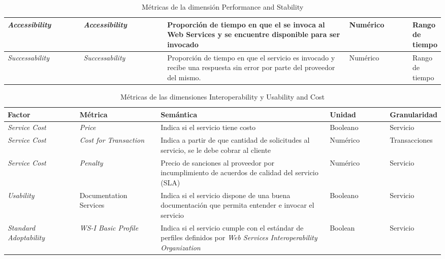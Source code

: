 \begin{table}[h]
\begin{tabular}{ |p{0.18\linewidth} | p{0.20\linewidth} | p{0.45\linewidth} | p{0.15\linewidth} | p{0.20\linewidth}|}
      \hline
        \emph{Accessibility} &  \emph{Accessibility}  & Proporción de tiempo en que el se invoca al Web Services y se encuentre disponible para ser invocado & Numérico & Rango de tiempo\\
       \hline
        \emph{Successability} &  \emph{Successability} & Proporción de tiempo en que el servicio es invocado y recibe una respuesta sin error por parte del proveedor del mismo. & Numérico & Rango de tiempo\\
      \hline
    \end{tabular}
    \caption{Métricas de la dimensión Performance and Stability}
    \label{tabla:definicion_metricas_per_stab}
  \end{table}

 \begin{table}[h]
  \centering
    \begin{tabular}{ |p{0.18\linewidth} | p{0.20\linewidth} | p{0.45\linewidth} | p{0.15\linewidth} | p{0.20\linewidth}|} 
    \hline
     \textbf{Factor} & \textbf{Métrica} & \textbf{Semántica}  & \textbf{Unidad}  & \textbf{Granularidad}  \\
      \hline
      \hline
       \emph{Service Cost} &  \emph{Price} & Indica si el servicio tiene costo & Booleano & Servicio \\
       \hline
       \emph{Service Cost} &  \emph{Cost for Transaction} & Indica a partir de que cantidad de solicitudes al servicio, se le debe cobrar al cliente  & Numérico & Transacciones \\
       \hline
       \emph{Service Cost} &  \emph{Penalty} & Precio de sanciones al proveedor por incumplimiento de acuerdos de calidad del servicio (SLA)& Numérico & Servicio \\
        \hline
       \emph{Usability} & {Documentation Services} & Indica si el servicio dispone de una buena documentación que permita entender e invocar el servicio & Booleano & Servicio \\
      \hline
       \hline
        \emph{Standard Adoptability} &  \emph{WS-I Basic Profile} & Indica si el servicio cumple con el estándar de perfiles definidos por \emph{Web Services Interoperability Organization} & Boolean & Servicio \\
       \hline
       \hline
    \end{tabular}
    \caption{Métricas de las dimensiones Interoperability y Usability and Cost }
    \label{tabla:definicion_metricas_wsi_usa_cost}
  \end{table}

